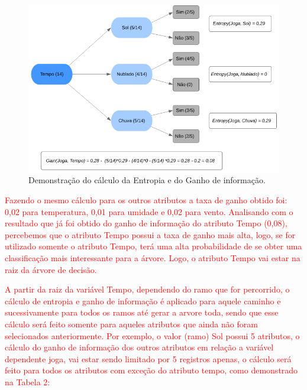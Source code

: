\begin{figure}[!htp]
	\begin{center}
    \caption{\label{fig:waveform_fig} Demonstração do cálculo da Entropia e do Ganho de informação.}
	\includegraphics[scale=0.80]{Figuras/Calculo_ganho_de_informacao.png}
	\end{center}
\end{figure}

\par
\textcolor{red}{Fazendo o mesmo cálculo para os outros atributos a taxa de ganho obtido foi: 0,02 para temperatura, 0,01 para umidade e 0,02 para vento. Analisando com o resultado que já foi obtido do ganho de informação do atributo Tempo (0,08), percebemos que o atributo Tempo possui a taxa de ganho mais alta, logo, se for utilizado somente o atributo Tempo, terá uma alta probabilidade de se obter uma classificação mais interessante para a árvore. Logo, o atributo Tempo vai estar na raiz da árvore de decisão.}

\par
\textcolor{red}{A partir da raiz da variável Tempo, dependendo do ramo que for percorrido, o cálculo de entropia e ganho de informação é aplicado para aquele caminho e sucessivamente para todos os ramos até gerar a arvore toda, sendo que esse cálculo será feito somente para aqueles atributos que ainda não foram selecionados anteriormente. Por exemplo, o valor (ramo) Sol possui 5 atributos, o cálculo do ganho de informação dos outros atributos em relação a variável dependente joga, vai estar sendo limitado por 5 registros apenas, o cálculo será feito para todos os atributos com exceção do atributo tempo, como demonstrado na Tabela 2:}

